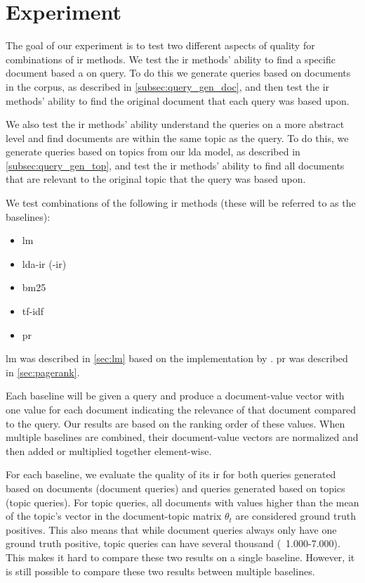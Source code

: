\section{Experiment}\label{sec:experiment}

The goal of our experiment is to test two different aspects of quality for combinations of \gls{ir} methods.
We test the \gls{ir} methods' ability to find a specific document based a on query.
To do this we generate queries based on documents in the corpus, as described in \autoref{subsec:query_gen_doc}, and then test the \gls{ir} methods' ability to find the original document that each query was based upon.

We also test the \gls{ir} methods' ability understand the queries on a more abstract level and find documents are within the same topic as the query.
To do this, we generate queries based on topics from our \gls{lda} model, as described in \autoref{subsec:query_gen_top}, and test the \gls{ir} methods' ability to find all documents that are relevant to the original topic that the query was based upon.

We test combinations of the following \gls{ir} methods (these will be referred to as the baselines):
\begin{itemize}
	\item \acrfull{lm}
	\item \acrlong{lda}-\acrlong{ir} (-\acrshort{ir})
	\item \acrfull{bm25}
	\item \acrfull{tf-idf}
	\item \acrfull{pr}
\end{itemize}

\gls{lm} was described in \autoref{sec:lm} based on the implementation by \citeauthor{yang2009topic}\cite{yang2009topic}.
\gls{pr} was described in \autoref{sec:pagerank}.



Each baseline will be given a query and produce a document-value vector with one value for each document indicating the relevance of that document compared to the query.
Our results are based on the ranking order of these values.
When multiple baselines are combined, their document-value vectors are normalized and then added or multiplied together element-wise.

For each baseline, we evaluate the quality of its \gls{ir} for both queries generated based on documents (document queries) and queries generated based on topics (topic queries).
For topic queries, all documents with values higher than the mean of the topic's vector in the document-topic matrix $\theta_t$ are considered ground truth positives.
This also means that while document queries always only have one ground truth positive, topic queries can have several thousand (~1.000-7.000).
This makes it hard to compare these two results on a single baseline.
However, it is still possible to compare these two results between multiple baselines.

